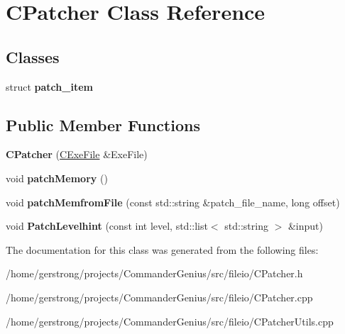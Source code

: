 \hypertarget{class_c_patcher}{
\section{CPatcher Class Reference}
\label{class_c_patcher}
}
\subsection*{Classes}
\begin{DoxyCompactItemize}
\item 
struct {\bfseries patch\_\-item}
\end{DoxyCompactItemize}
\subsection*{Public Member Functions}
\begin{DoxyCompactItemize}
\item 
\hypertarget{class_c_patcher_a875e3928579e25b5746b2171ccff5d47}{
{\bfseries CPatcher} (\hyperlink{class_c_exe_file}{CExeFile} \&ExeFile)}
\label{class_c_patcher_a875e3928579e25b5746b2171ccff5d47}

\item 
\hypertarget{class_c_patcher_a0546d1a925412a0e2b8d3c2cbfff5bbe}{
void {\bfseries patchMemory} ()}
\label{class_c_patcher_a0546d1a925412a0e2b8d3c2cbfff5bbe}

\item 
\hypertarget{class_c_patcher_adcf5d20c3ce39afa1920b2d2b90d6699}{
void {\bfseries patchMemfromFile} (const std::string \&patch\_\-file\_\-name, long offset)}
\label{class_c_patcher_adcf5d20c3ce39afa1920b2d2b90d6699}

\item 
\hypertarget{class_c_patcher_a6b8f459a88819830672999724ecd6fd9}{
void {\bfseries PatchLevelhint} (const int level, std::list$<$ std::string $>$ \&input)}
\label{class_c_patcher_a6b8f459a88819830672999724ecd6fd9}

\end{DoxyCompactItemize}


The documentation for this class was generated from the following files:\begin{DoxyCompactItemize}
\item 
/home/gerstrong/projects/CommanderGenius/src/fileio/CPatcher.h\item 
/home/gerstrong/projects/CommanderGenius/src/fileio/CPatcher.cpp\item 
/home/gerstrong/projects/CommanderGenius/src/fileio/CPatcherUtils.cpp\end{DoxyCompactItemize}
